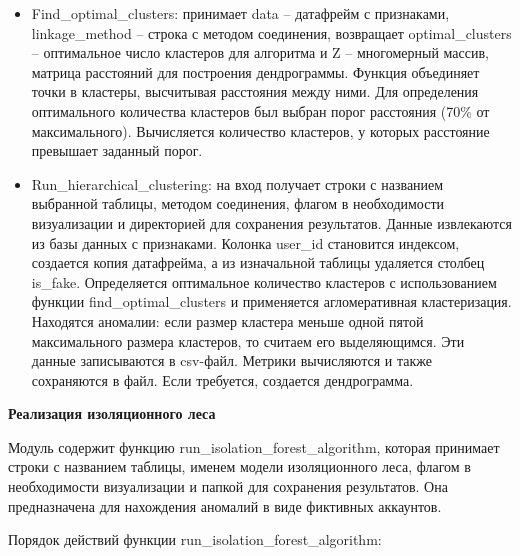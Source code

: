 \begin{itemize}[itemindent=2cm, leftmargin=0cm, labelsep=0.3cm, topsep=0cm, itemsep=0cm, parsep=0cm, before=\vspace{-0.15cm}, after=\vspace{-0.15cm}]
    \item Find\_optimal\_clusters: принимает data -- датафрейм с признаками, linkage\_method -- строка с методом соединения, возвращает optimal\_clusters -- оптимальное число кластеров для алгоритма и Z -- многомерный массив, матрица расстояний для построения дендрограммы. Функция объединяет точки в кластеры, высчитывая расстояния между ними. Для определения оптимального количества кластеров был выбран порог расстояния (70\% от максимального). Вычисляется количество кластеров, у которых расстояние превышает заданный порог.
    \item Run\_hierarchical\_clustering: на вход получает строки с названием выбранной таблицы, методом соединения, флагом в необходимости визуализации и директорией для сохранения результатов. Данные извлекаются из базы данных с признаками. Колонка user\_id становится индексом, создается копия датафрейма, а из изначальной таблицы удаляется столбец is\_fake. Определяется оптимальное количество кластеров с использованием функции find\_optimal\_clusters и применяется агломеративная кластеризация. Находятся аномалии: если размер кластера меньше одной пятой максимального размера кластеров, то считаем его выделяющимся. Эти данные записываются в csv-файл. Метрики вычисляются и также сохраняются в файл. Если требуется, создается дендрограмма.
\end{itemize}


\textbf{Реализация изоляционного леса}

Модуль содержит функцию run\_isolation\_forest\_algorithm, которая принимает строки с названием таблицы, именем модели изоляционного леса, флагом в необходимости визуализации и папкой для сохранения результатов. Она предназначена для нахождения аномалий в виде фиктивных аккаунтов.

Порядок действий функции run\_isolation\_forest\_algorithm:

